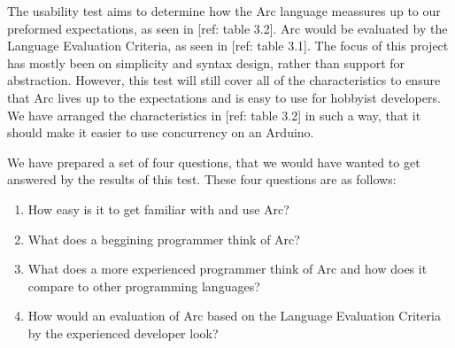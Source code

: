 The usability test aims to determine how the Arc language meassures up to our preformed expectations, as seen in [ref: table 3.2]. Arc would be evaluated by the Language Evaluation Criteria, as seen in [ref: table 3.1]. The focus of this project has mostly been on simplicity and syntax design, rather than support for abstraction. However, this test will still cover all of the characteristics to ensure that Arc lives up to the expectations and is easy to use for hobbyist developers. We have arranged the characteristics in [ref: table 3.2] in such a way, that it should make it easier to use concurrency on an Arduino.

We have prepared a set of four questions, that we would have wanted to get answered by the results of this test. These four questions are as follows:

\begin{enumerate}
    \item How easy is it to get familiar with and use Arc?
    \item What does a beggining programmer think of Arc?
    \item What does a more experienced programmer think of Arc and how does it compare to other programming languages?
    \item How would an evaluation of Arc based on the Language Evaluation Criteria by the experienced developer look?
\end{enumerate}




